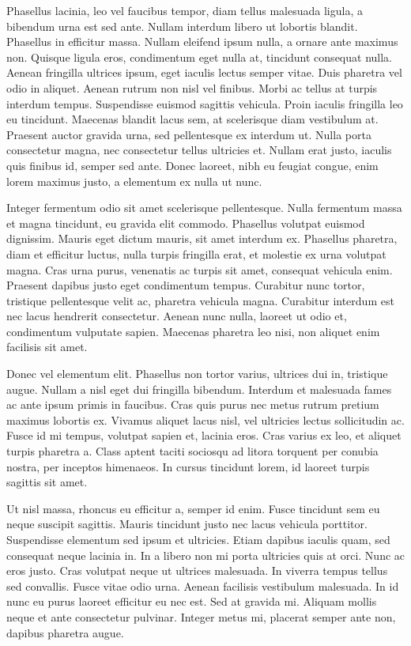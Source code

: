 \documentclass{article}
\begin{document}
Phasellus lacinia, leo vel faucibus tempor, diam tellus malesuada ligula, a bibendum urna est sed ante. Nullam interdum libero ut lobortis blandit. Phasellus in efficitur massa. Nullam eleifend ipsum nulla, a ornare ante maximus non. Quisque ligula eros, condimentum eget nulla at, tincidunt consequat nulla. Aenean fringilla ultrices ipsum, eget iaculis lectus semper vitae. Duis pharetra vel odio in aliquet. Aenean rutrum non nisl vel finibus. Morbi ac tellus at turpis interdum tempus. Suspendisse euismod sagittis vehicula. Proin iaculis fringilla leo eu tincidunt. Maecenas blandit lacus sem, at scelerisque diam vestibulum at. Praesent auctor gravida urna, sed pellentesque ex interdum ut. Nulla porta consectetur magna, nec consectetur tellus ultricies et. Nullam erat justo, iaculis quis finibus id, semper sed ante. Donec laoreet, nibh eu feugiat congue, enim lorem maximus justo, a elementum ex nulla ut nunc.

Integer fermentum odio sit amet scelerisque pellentesque. Nulla fermentum massa et magna tincidunt, eu gravida elit commodo. Phasellus volutpat euismod dignissim. Mauris eget dictum mauris, sit amet interdum ex. Phasellus pharetra, diam et efficitur luctus, nulla turpis fringilla erat, et molestie ex urna volutpat magna. Cras urna purus, venenatis ac turpis sit amet, consequat vehicula enim. Praesent dapibus justo eget condimentum tempus. Curabitur nunc tortor, tristique pellentesque velit ac, pharetra vehicula magna. Curabitur interdum est nec lacus hendrerit consectetur. Aenean nunc nulla, laoreet ut odio et, condimentum vulputate sapien. Maecenas pharetra leo nisi, non aliquet enim facilisis sit amet.

Donec vel elementum elit. Phasellus non tortor varius, ultrices dui in, tristique augue. Nullam a nisl eget dui fringilla bibendum. Interdum et malesuada fames ac ante ipsum primis in faucibus. Cras quis purus nec metus rutrum pretium maximus lobortis ex. Vivamus aliquet lacus nisl, vel ultricies lectus sollicitudin ac. Fusce id mi tempus, volutpat sapien et, lacinia eros. Cras varius ex leo, et aliquet turpis pharetra a. Class aptent taciti sociosqu ad litora torquent per conubia nostra, per inceptos himenaeos. In cursus tincidunt lorem, id laoreet turpis sagittis sit amet.

Ut nisl massa, rhoncus eu efficitur a, semper id enim. Fusce tincidunt sem eu neque suscipit sagittis. Mauris tincidunt justo nec lacus vehicula porttitor. Suspendisse elementum sed ipsum et ultricies. Etiam dapibus iaculis quam, sed consequat neque lacinia in. In a libero non mi porta ultricies quis at orci. Nunc ac eros justo. Cras volutpat neque ut ultrices malesuada. In viverra tempus tellus sed convallis. Fusce vitae odio urna. Aenean facilisis vestibulum malesuada. In id nunc eu purus laoreet efficitur eu nec est. Sed at gravida mi. Aliquam mollis neque et ante consectetur pulvinar. Integer metus mi, placerat semper ante non, dapibus pharetra augue.
\end{document}
